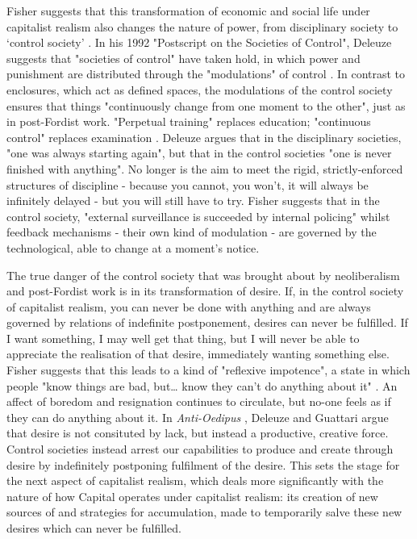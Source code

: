 Fisher suggests that this transformation of economic and social life under capitalist realism also changes the nature of power, from disciplinary society to `control society' \citeyearpar[p. 22]{fisher_capitalist_2009}. In his 1992 "Postscript on the Societies of Control", Deleuze suggests that "societies of control" have taken hold, in which power and punishment are distributed through the "modulations" of control \citep[p. 4]{gilles_deleuze_postscript_1992}. In contrast to enclosures, which act as defined spaces, the modulations of the control society ensures that things "continuously change from one moment to the other", just as in post-Fordist work. "Perpetual training" replaces education; "continuous control" replaces examination \citep[p. 5]{gilles_deleuze_postscript_1992}. Deleuze argues that in the disciplinary societies, "one was always starting again", but that in the control societies "one is never finished with anything". No longer is the aim to meet the rigid, strictly-enforced structures of discipline - because you cannot, you won't, it will always be infinitely delayed - but you will still have to try. Fisher suggests that in the control society, "external surveillance is succeeded by internal policing" \citep[p. 22]{fisher_capitalist_2009} whilst feedback mechanisms - their own kind of modulation - are governed by the technological, able to change at a moment's notice. 

The true danger of the control society that was brought about by neoliberalism and post-Fordist work is in its transformation of desire. If, in the control society of capitalist realism, you can never be done with anything and are always governed by relations of indefinite postponement, desires can never be fulfilled. If I want something, I may well get that thing, but I will never be able to appreciate the realisation of that desire, immediately wanting something else. Fisher suggests that this leads to a kind of "reflexive impotence", a state in which people "know things are bad, but\ldots{} know they can't do anything about it" \citep[p. 21]{fisher_capitalist_2009}. An affect of boredom and resignation continues to circulate, but no-one feels as if they can do anything about it. In \emph{Anti-Oedipus} \citeyearpar{deleuze_anti-oedipus:_1983}, Deleuze and Guattari argue that desire is not consituted by lack, but instead a productive, creative force. Control societies instead arrest our capabilities to produce and create through desire by indefinitely postponing fulfilment of the desire.  This sets the stage for the next aspect of capitalist realism, which deals more significantly with the nature of how Capital operates under capitalist realism: its creation of new sources of and strategies for accumulation, made to temporarily salve these new desires which can never be fulfilled.

